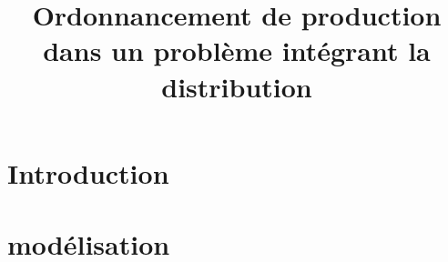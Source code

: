 \documentclass{polytech/polytech}
\title{Ordonnancement de production dans un problème intégrant la distribution}
\begin{document}
\part{Introduction}


\part{modélisation}

\end{document}
